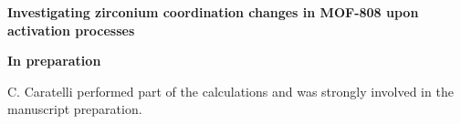 \vspace{0.1\textheight}
{
\large
\textbf{Investigating zirconium coordination changes in MOF-808 upon activation processes} }
 
\noindent
\textbf{In preparation}

\vfill

\noindent C. Caratelli performed part of the calculations and was strongly involved in the manuscript preparation.
\npar

\clearpage{\pagestyle{empty}\cleardoublepage}
% 
\clearpage{\pagestyle{empty}\cleardoublepage}


\clearpage{\pagestyle{empty}\cleardoublepage}
